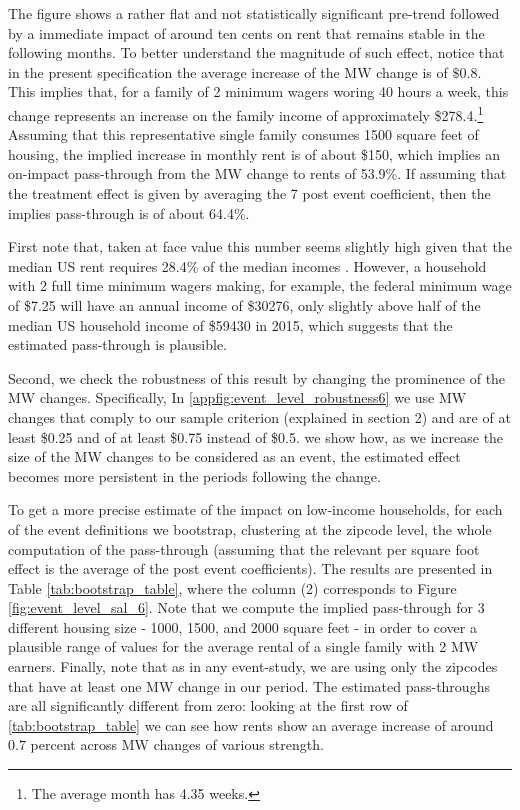 The figure shows a rather flat and not statistically significant pre-trend followed by a immediate impact of around ten cents on rent that remains stable in the following months. 
To better understand the magnitude of such effect, notice that in the present specification the average increase of the MW change is of $\$0.8$. This implies that, for a family of 2 minimum wagers woring 40 hours a week, this change represents an increase on the family income of approximately \$278.4.\footnote{The average month has 4.35 weeks.} Assuming that this representative single family consumes 1500 square feet of housing, the implied increase in monthly rent is of about \$150, which implies an on-impact pass-through from the MW change to rents of 53.9\%. If assuming that the treatment effect is given by averaging the 7 post event coefficient, then the implies pass-through is of about 64.4\%.

First note that, taken at face value this number seems slightly high given that the median US rent requires 28.4\% of the median incomes \parencite{bi}. However, a household with 2 full time minimum wagers making, for example, the federal minimum wage of \$7.25 will have an annual income of \$30276, only slightly above half of the median US household income of \$59430 in 2015, which suggests that the estimated pass-through is plausible. 

Second, we check the robustness of this result by changing the prominence of the MW changes. Specifically, In \autoref{appfig:event_level_robustness6} we use MW changes that comply to our sample criterion (explained in section 2) and are of at least \$0.25 and of at least \$0.75 instead of \$0.5. we show how, as we increase the size of the MW changes to be considered as an event, the estimated effect becomes more persistent in the periods following the change. 

To get a more precise estimate of the impact on low-income households, for each of the event definitions we bootstrap, clustering at the zipcode level, the whole computation of the pass-through (assuming that the relevant per square foot effect is the average of the post event coefficients). The results are presented in Table \ref{tab:bootstrap_table}, where the column (2) corresponds to Figure \ref{fig:event_level_sal_6}. Note that we compute the implied pass-through for 3 different housing size - 1000, 1500, and 2000 square feet - in order to cover a plausible range of values for the average rental of a single family with 2 MW earners. Finally, note that as in any event-study, we are using only the zipcodes that have at least one MW change in our period. The estimated pass-throughs are all significantly different from zero: looking at the first row of \autoref{tab:bootstrap_table} we can see how rents show an average increase of around $0.7$ percent across MW changes of various strength. 


